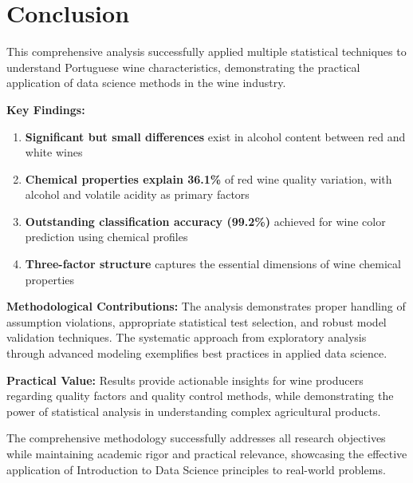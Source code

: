 \chapter{Conclusion}

This comprehensive analysis successfully applied multiple statistical techniques to understand Portuguese wine characteristics, demonstrating the practical application of data science methods in the wine industry.

\textbf{Key Findings:}
\begin{enumerate}
\item \textbf{Significant but small differences} exist in alcohol content between red and white wines
\item \textbf{Chemical properties explain 36.1\%} of red wine quality variation, with alcohol and volatile acidity as primary factors
\item \textbf{Outstanding classification accuracy (99.2\%)} achieved for wine color prediction using chemical profiles
\item \textbf{Three-factor structure} captures the essential dimensions of wine chemical properties
\end{enumerate}

\textbf{Methodological Contributions:} The analysis demonstrates proper handling of assumption violations, appropriate statistical test selection, and robust model validation techniques. The systematic approach from exploratory analysis through advanced modeling exemplifies best practices in applied data science.

\textbf{Practical Value:} Results provide actionable insights for wine producers regarding quality factors and quality control methods, while demonstrating the power of statistical analysis in understanding complex agricultural products.

The comprehensive methodology successfully addresses all research objectives while maintaining academic rigor and practical relevance, showcasing the effective application of Introduction to Data Science principles to real-world problems.